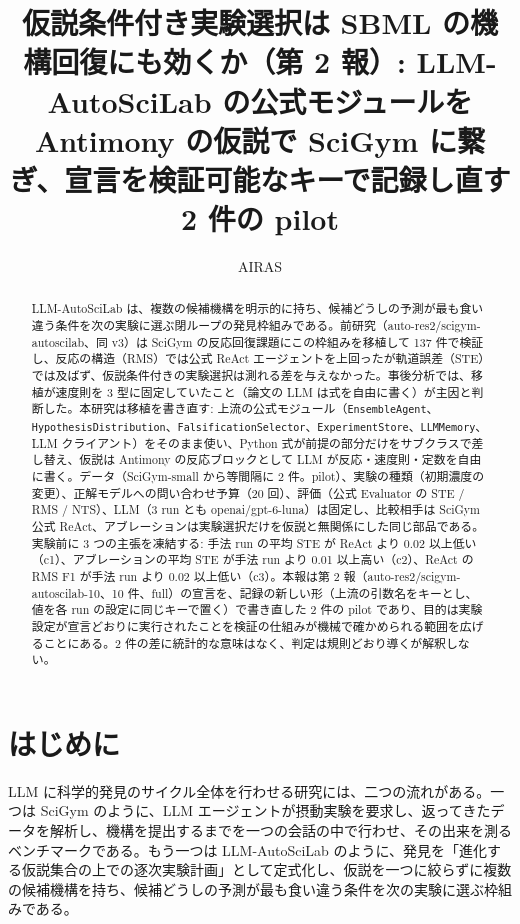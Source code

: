\documentclass{article}
\title{仮説条件付き実験選択は SBML の機構回復にも効くか（第 2 報）: LLM-AutoSciLab の公式モジュールを Antimony の仮説で SciGym に繋ぎ、宣言を検証可能なキーで記録し直す 2 件の pilot}
\author{AIRAS}
\begin{document}
\maketitle

\begin{abstract}
LLM-AutoSciLab \citep{kabra-2026-llm} は、複数の候補機構を明示的に持ち、候補どうしの予測が最も食い違う条件を次の実験に選ぶ閉ループの発見枠組みである。前研究（auto-res2/scigym-autoscilab、同 v3）は SciGym \citep{duan-2025-measuring} の反応回復課題にこの枠組みを移植して 137 件で検証し、反応の構造（RMS）では公式 ReAct エージェントを上回ったが軌道誤差（STE）では及ばず、仮説条件付きの実験選択は測れる差を与えなかった。事後分析では、移植が速度則を 3 型に固定していたこと（論文の LLM は式を自由に書く）が主因と判断した。本研究は移植を書き直す: 上流の公式モジュール（\texttt{EnsembleAgent}、\texttt{HypothesisDistribution}、\texttt{FalsificationSelector}、\texttt{ExperimentStore}、\texttt{LLMMemory}、LLM クライアント）をそのまま使い、Python 式が前提の部分だけをサブクラスで差し替え、仮説は Antimony の反応ブロックとして LLM が反応・速度則・定数を自由に書く。データ（SciGym-small から等間隔に 2 件。pilot）、実験の種類（初期濃度の変更）、正解モデルへの問い合わせ予算（20 回）、評価（公式 Evaluator の STE / RMS / NTS）、LLM（3 run とも openai/gpt-6-luna）は固定し、比較相手は SciGym 公式 ReAct、アブレーションは実験選択だけを仮説と無関係にした同じ部品である。実験前に 3 つの主張を凍結する: 手法 run の平均 STE が ReAct より 0.02 以上低い（c1）、アブレーションの平均 STE が手法 run より 0.01 以上高い（c2）、ReAct の RMS F1 が手法 run より 0.02 以上低い（c3）。本報は第 2 報（auto-res2/scigym-autoscilab-10、10 件、full）の宣言を、記録の新しい形（上流の引数名をキーとし、値を各 run の設定に同じキーで置く）で書き直した 2 件の pilot であり、目的は実験設定が宣言どおりに実行されたことを検証の仕組みが機械で確かめられる範囲を広げることにある。2 件の差に統計的な意味はなく、判定は規則どおり導くが解釈しない。
\end{abstract}

\section{はじめに}
\label{sec:intro}
LLM に科学的発見のサイクル全体を行わせる研究には、二つの流れがある。一つは SciGym \citep{duan-2025-measuring} のように、LLM エージェントが摂動実験を要求し、返ってきたデータを解析し、機構を提出するまでを一つの会話の中で行わせ、その出来を測るベンチマークである。もう一つは LLM-AutoSciLab \citep{kabra-2026-llm} のように、発見を「進化する仮説集合の上での逐次実験計画」として定式化し、仮説を一つに絞らずに複数の候補機構を持ち、候補どうしの予測が最も食い違う条件を次の実験に選ぶ枠組みである。
\end{document}
